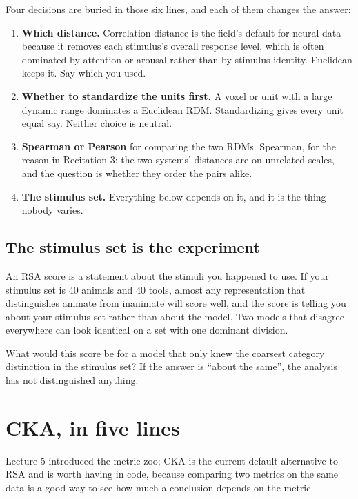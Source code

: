\documentclass[11pt]{article}
\begin{document}
Four decisions are buried in those six lines, and each of them changes the
answer:

\begin{enumerate}
  \item \textbf{Which distance.} Correlation distance is the field's default for
        neural data because it removes each stimulus's overall response level,
        which is often dominated by attention or arousal rather than by
        stimulus identity. Euclidean keeps it. Say which you used.
  \item \textbf{Whether to standardize the units first.} A voxel or unit with a
        large dynamic range dominates a Euclidean RDM. Standardizing gives every
        unit equal say. Neither choice is neutral.
  \item \textbf{Spearman or Pearson} for comparing the two RDMs. Spearman, for
        the reason in Recitation 3: the two systems' distances are on unrelated
        scales, and the question is whether they order the pairs alike.
  \item \textbf{The stimulus set.} Everything below depends on it, and it is the
        thing nobody varies.
\end{enumerate}

\subsection{The stimulus set is the experiment}

An RSA score is a statement about the stimuli you happened to use. If your
stimulus set is 40 animals and 40 tools, almost any representation that
distinguishes animate from inanimate will score well, and the score is telling
you about your stimulus set rather than about the model. Two models that
disagree everywhere can look identical on a set with one dominant division.

\begin{keybox}
 What would this score be for a
model that only knew the coarsest category distinction in the stimulus set? If
the answer is ``about the same'', the analysis has not distinguished anything.
\end{keybox}

\section{CKA, in five lines}

Lecture 5 introduced the metric zoo; CKA is the current default alternative to
RSA and is worth having in code, because comparing two metrics on the same data
is a good way to see how much a conclusion depends on the metric.
\end{document}
